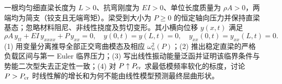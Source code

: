 一根均匀细直梁长度为 \(L>0\)、抗弯刚度为 \(EI>0\)、单位长度质量为 \(\rho A>0\)，两端均为简支（铰支且无端弯矩）。梁受到大小为 \(P\ge0\) 的恒定轴向压力并保持直梁基态；忽略材料阻尼、非线性挠度及剪切变形。其小横向位移 \(y(x,t)\) 满足
\[
\rho A\,y_{tt}+EI\,y_{xxxx}+P\,y_{xx}=0,
\quad y(0,t)=y(L,t)=0,\quad y_{xx}(0,t)=y_{xx}(L,t)=0.
\]
(1) 用变量分离推导全部正交弯曲模态及相应 \(\omega_n^2(P)\)；(2) 推出稳定直梁的严格负载区间与第一 Euler 临界压力；(3) 写出线性振动能量泛函并证明该临界条件与势能二次型失去正定性一致；(4) 对 \(P\uparrow P_{\rm cr}\) 求最低模频率软化的标度，讨论 \(P>P_{\rm cr}\) 时线性解的增长和为何不能由线性模型预测最终屈曲形状。
